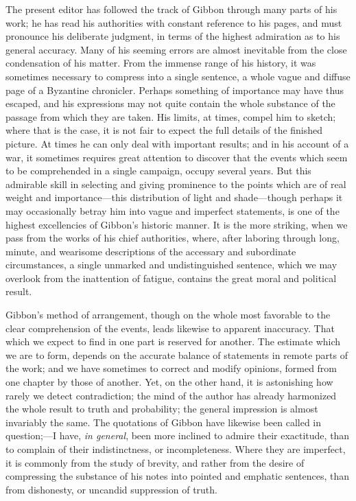 The present editor has followed the track of Gibbon through many parts of his
work; he has read his authorities with constant reference to his pages, and
must pronounce his deliberate judgment, in terms of the highest admiration
as to his general accuracy. Many of his seeming errors are almost inevitable
from the close condensation of his matter. From the immense range of his history,
it was sometimes necessary to compress into a single sentence, a whole vague
and diffuse page of a Byzantine chronicler. Perhaps something of importance
may have thus escaped, and his expressions may not quite contain the whole
substance of the passage from which they are taken. His limits, at times, compel
him to sketch; where that is the case, it is not fair to expect the full details
of the finished picture. At times he can only deal with important results; and
in his account of a war, it sometimes requires great attention to discover that
the events which seem to be comprehended in a single campaign, occupy several
years. But this admirable skill in selecting and giving prominence to the points
which are of real weight and importance—this distribution of light and shade—though
perhaps it may occasionally betray him into vague and imperfect statements,
is one of the highest excellencies of Gibbon’s historic manner. It is the more
striking, when we pass from the works of his chief authorities, where, after
laboring through long, minute, and wearisome descriptions of the accessary
and subordinate circumstances, a single unmarked and undistinguished sentence,
which we may overlook from the inattention of fatigue, contains the great moral
and political result.

Gibbon’s method of arrangement, though on the whole most favorable to the clear
comprehension of the events, leads likewise to apparent inaccuracy. That which
we expect to find in one part is reserved for another. The estimate which we
are to form, depends on the accurate balance of statements in remote parts
of the work; and we have sometimes to correct and modify opinions, formed
from one chapter by those of another. Yet, on the other hand, it is astonishing
how rarely we detect contradiction; the mind of the author has already
harmonized the whole result to truth and probability; the general impression
is almost invariably the same. The quotations of Gibbon have likewise been
called in question;—I have, \textit{in general}, been more inclined to admire
their exactitude, than to complain of their indistinctness, or incompleteness.
Where they are imperfect, it is commonly from the study of brevity, and rather
from the desire of compressing the substance of his notes into pointed and
emphatic sentences, than from dishonesty, or uncandid suppression of truth.

